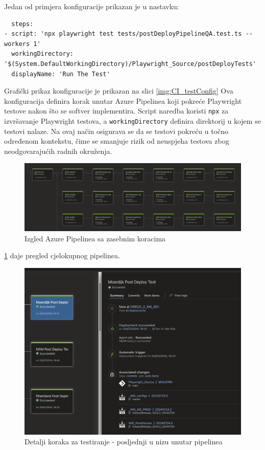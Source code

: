Jedan od primjera konfiguracije prikazan je u nastavku:
\begin{verbatim}
  steps: 
- script: 'npx playwright test tests/postDeployPipelineQA.test.ts --workers 1' 
  workingDirectory: '$(System.DefaultWorkingDirectory)/Playwright_Source/postDeployTests' 
  displayName: 'Run The Test'
\end{verbatim}
Grafički prikaz konfiguracije je prikazan na slici \ref{img:CI_testConfig}  
Ova konfiguracija definira korak unutar Azure Pipelinea koji pokreće Playwright testove nakon što se softver implementira.
Script naredba koristi \texttt{npx} za izvršavanje Playwright testova, a \texttt{workingDirectory} definira direktorij u kojem se testovi nalaze.
Na ovaj način osigurava se da se testovi pokreću u točno određenom kontekstu, čime se smanjuje rizik od neuspjeha testova zbog neodgovarajućih radnih okruženja.


\begin{figure}[!h]\begin{center}
  \includegraphics[width=1\textwidth]{"img/CI_pipelinePreview"}
  \caption{Izgled Azure Pipelinea sa zasebnim koracima}\label{img:CI_pipelinePreview}
\end{center}\end{figure}

\ref{img:CI_pipelinePreview} daje pregled cjelokupnog pipelinea.

\begin{figure}[!h]\begin{center}
  \includegraphics[width=1\textwidth]{"img/CI_pipelineDetails"}
  \caption{Detalji koraka za testiranje - posljednji u nizu unutar pipelinea}\label{img:CI_pipelineDetails}
\end{center}\end{figure}

